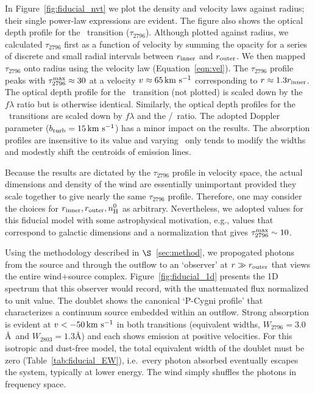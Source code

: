 \documentclass[12pt,preprint]{aastex}
\begin{document}
In Figure~\ref{fig:fiducial_nvt} we plot the density and velocity
laws against radius;  
their single power-law expressions are evident.  The figure also
shows the optical depth profile for the \mgiia\ transition ($\tau_{2796}$).
Although plotted against radius, we calculated $\tau_{2796}$ first
as a function of velocity by summing the opacity for a series of
discrete and small radial intervals
between $r_{\rm inner}$  and $r_{\rm outer}$.   We then mapped
$\tau_{2796}$ onto radius using the velocity law
(Equation~\ref{eqn:vel}). 
The $\tau_{2796}$ profile peaks with $\tau_{2796}^{\rm max} \approx 30$
at a velocity $v \approx 65 \, {\rm km~s^{-1}}$ corresponding to $r \approx 1.3
r_{\rm inner}$.  The optical depth profile for the \mgiib\ transition
(not plotted) is scaled down by the $f\lambda$ ratio but is otherwise identical.  Similarly,
the optical depth profiles for the \feiid\ transitions are
scaled down by $f \lambda$ and the \nfe/\nmg\ ratio.  
The adopted Doppler parameter
($b_{\rm turb} = 15 \, {\rm km~s^{-1}}$) has a minor impact on the results.
The absorption profiles are insensitive to its value and varying \bturb\
only tends to modify the widths and modestly
shift the centroids of emission lines.

Because the results are dictated by the $\tau_{2796}$ profile in
velocity space, the actual dimensions and density of the wind are
essentially unimportant provided they scale together to give nearly the same
$\tau_{2796}$ profile.  Therefore, one may consider the choices for
$r_{\rm inner}, r_{\rm outer}, n_{\rm H}^0$ as arbitrary.
Nevertheless, we adopted values for this fiducial model with
some astrophysical motivation,  e.g., values that correspond to
galactic dimensions and a normalization that gives $\tau_{2796}^{\rm
  max} \sim 10$.


Using the methodology described in $\S$~\ref{sec:method}, we
propogated photons from the source and through the outflow to an
`observer' at $r \gg r_{\rm outer}$ that views the entire wind+source
complex.  Figure~\ref{fig:fiducial_1d} presents the 1D spectrum
that this observer would record, with the unattenuated flux
normalized to unit value.   The  doublet
shows the canonical `P-Cygni profile' that characterizes a continuum
source embedded within an outflow.  Strong absorption is evident at
$v < -50 \, {\rm km~s^{-1}}$ in both transitions (equivalent widths, $W_{2796} =
3.0$\AA\ and $W_{2803} = 1.3$\AA) and each shows emission at
positive velocities.  For this isotropic and dust-free model, the
total equivalent width of the doublet must be zero
(Table~\ref{tab:fiducial_EW}), i.e.\ every photon
absorbed eventually escapes the system, typically at lower
energy.  The wind simply shuffles the photons in frequency space.
\end{document}
